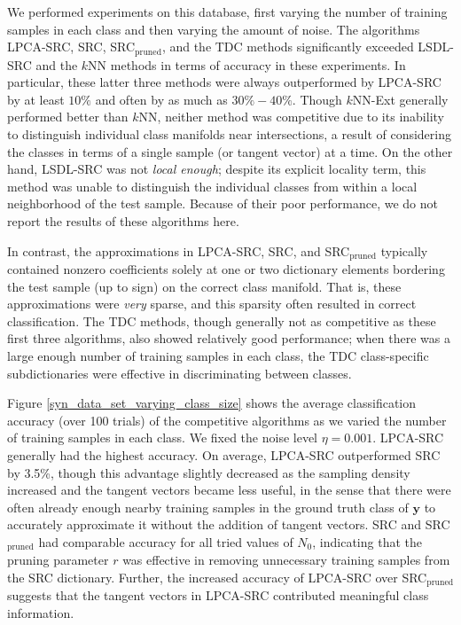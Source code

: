 \documentclass[review]{elsarticle}
\begin{document}
We performed experiments on this database, first varying the number of training samples in each class and then varying the amount of noise. The algorithms LPCA-SRC, SRC, SRC$_\mathrm{pruned}$, and the TDC methods significantly exceeded LSDL-SRC and the $k$NN methods in terms of accuracy in these experiments. In particular, these latter three methods were always outperformed by LPCA-SRC by at least $10\%$ and often by as much as $30\%-40\%$. Though $k$NN-Ext generally performed better than $k$NN, neither method was competitive due to its inability to distinguish individual class manifolds near intersections, a result of considering the classes in terms of a single sample (or tangent vector) at a time. On the other hand, LSDL-SRC was not \emph{local enough}; despite its explicit locality term, this method was unable to distinguish the individual classes from within a local neighborhood of the test sample. Because of their poor performance, we do not report the results of these algorithms here. 

In contrast, the approximations in LPCA-SRC, SRC, and SRC$_\mathrm{pruned}$ typically contained nonzero coefficients solely at one or two dictionary elements bordering the test sample (up to sign) on the correct class manifold. That is, these approximations were \emph{very} sparse, and this sparsity often resulted in correct classification. The TDC methods, though generally not as competitive as these first three algorithms, also showed relatively good performance; when there was a large enough number of training samples in each class, the TDC class-specific subdictionaries were effective in discriminating between classes.

Figure \ref{syn_data_set_varying_class_size} shows the average classification accuracy (over 100 trials) of the competitive algorithms as we varied the number of training samples in each class. We fixed the noise level $\eta = 0.001$. LPCA-SRC generally had the highest accuracy. On average, LPCA-SRC outperformed SRC by 3.5\%, though this advantage slightly decreased as the sampling density increased and the tangent vectors became less useful, in the sense that there were often already enough nearby training samples in the ground truth class of $\bm{y}$ to accurately approximate it without the addition of tangent vectors. SRC and SRC$_\mathrm{pruned}$ had comparable accuracy for all tried values of $N_0$, indicating that the pruning parameter $r$ was effective in removing unnecessary training samples from the SRC dictionary. Further, the increased accuracy of LPCA-SRC over SRC$_\mathrm{pruned}$ suggests that the tangent vectors in LPCA-SRC contributed meaningful class information.
 
\end{document}
